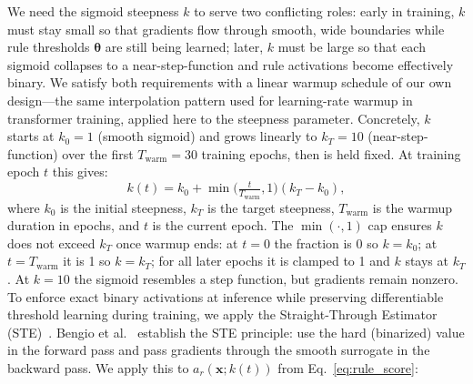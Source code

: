 \documentclass[journal]{IEEEtran}
\begin{document}
We need the sigmoid steepness $k$ to serve two conflicting roles: early in
training, $k$ must stay small so that gradients flow through smooth,
wide boundaries while rule thresholds $\boldsymbol{\theta}$ are still being
learned; later, $k$ must be large so that each sigmoid collapses to a
near-step-function and rule activations become effectively binary.
We satisfy both requirements with a linear warmup schedule of our own
design---the same interpolation pattern used for learning-rate warmup in
transformer training, applied here to the steepness parameter.
Concretely, $k$ starts at $k_0{=}1$ (smooth sigmoid) and grows linearly
to $k_T{=}10$ (near-step-function) over the first
$T_{\mathrm{warm}}{=}30$ training epochs, then is held fixed.
At training epoch $t$ this gives:
\begin{equation}
  k(t) = k_0 + \min\!\bigl(\tfrac{t}{T_{\mathrm{warm}}},1\bigr)(k_T{-}k_0),
  \label{eq:anneal}
\end{equation}
where $k_0$ is the initial steepness, $k_T$ is the target steepness,
$T_{\mathrm{warm}}$ is the warmup duration in epochs, and $t$ is the
current epoch. The $\min(\cdot,1)$ cap ensures $k$ does not exceed
$k_T$ once warmup ends: at $t{=}0$ the fraction is 0 so $k{=}k_0$;
at $t{=}T_{\mathrm{warm}}$ it is 1 so $k{=}k_T$; for all later epochs
it is clamped to 1 and $k$ stays at $k_T$.
At $k{=}10$ the sigmoid resembles a step function, but gradients remain
nonzero. To enforce exact binary activations at inference while preserving
differentiable threshold learning during training, we apply the
Straight-Through Estimator (STE)~\cite{bengio2013ste,liu2023reinmax}.
Bengio et al.~\cite{bengio2013ste} establish the STE principle: use the
hard (binarized) value in the forward pass and pass gradients through the
smooth surrogate in the backward pass. We apply this to
$a_r(\mathbf{x};k(t))$ from Eq.~\ref{eq:rule_score}:
\end{document}
